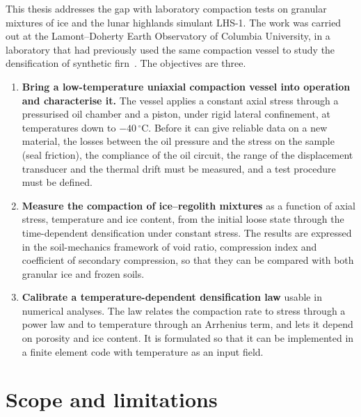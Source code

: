 This thesis addresses the gap with laboratory compaction tests on granular mixtures of ice and the lunar highlands simulant LHS-1. The work was carried out at the Lamont--Doherty Earth Observatory of Columbia University, in a laboratory that had previously used the same compaction vessel to study the densification of synthetic firn~\cite{skarbek2025data}. The objectives are three.
\begin{enumerate}
    \item \textbf{Bring a low-temperature uniaxial compaction vessel into operation and characterise it.} The vessel applies a constant axial stress through a pressurised oil chamber and a piston, under rigid lateral confinement, at temperatures down to $-40\,^\circ$C. Before it can give reliable data on a new material, the losses between the oil pressure and the stress on the sample (seal friction), the compliance of the oil circuit, the range of the displacement transducer and the thermal drift must be measured, and a test procedure must be defined.
    \item \textbf{Measure the compaction of ice--regolith mixtures} as a function of axial stress, temperature and ice content, from the initial loose state through the time-dependent densification under constant stress. The results are expressed in the soil-mechanics framework of void ratio, compression index and coefficient of secondary compression, so that they can be compared with both granular ice and frozen soils.
    \item \textbf{Calibrate a temperature-dependent densification law} usable in numerical analyses. The law relates the compaction rate to stress through a power law and to temperature through an Arrhenius term, and lets it depend on porosity and ice content. It is formulated so that it can be implemented in a finite element code with temperature as an input field.
\end{enumerate}

\section*{Scope and limitations}

